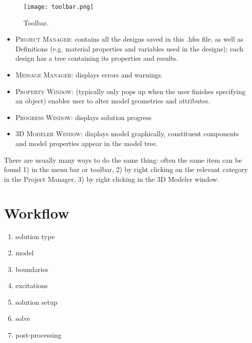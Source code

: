 \documentclass[11pt]{article}
\begin{document}
\begin{figure}[H]
	\centering
	\texttt{[image: toolbar.png]}
	\caption{Toolbar.}
	\label{fig:toolbar}
\end{figure}

\begin{itemize}

	\item \textsc{Project Manager:} contains all the designs saved in this .hfss file, as well as Definitions (e.g. material properties and variables used in the designs); each design has a tree containing its properties and results.

	\item \textsc{Message Manager:} displays errors and warnings.

	\item \textsc{Property Window:} (typically only pops up when the user finishes specifying an object) enables user to alter model geometries and attributes.

	\item \textsc{Progress Window:} displays solution progress

	\item \textsc{3D Modeler Window:} displays model graphically, constituent components and model properties appear in the model tree.

\end{itemize}

There are usually many ways to do the same thing: often the same item can be found 1) in the menu bar or toolbar, 2) by right clicking on the relevant category in the Project Manager, 3) by right clicking in the 3D Modeler window.



\section{Workflow}

\begin{enumerate}
	\itemsep-0.2em

	\item solution type
	\item model
	\item boundaries
	\item excitations
	\item solution setup
	\item solve
	\item post-processing

\end{enumerate}
\end{document}
